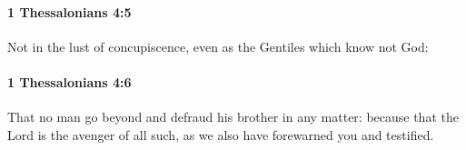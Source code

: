 		\paragraph{1 Thessalonians 4:5} %
			\label{1THESSALONIANS-4-5}

			Not in the lust of concupiscence, even as the Gentiles which know not God:

			\begin{framed}
			\scriptsize
				\begin{compactdesc}
					\item[SBLG] 
				\end{compactdesc}
			\end{framed}

		\paragraph{1 Thessalonians 4:6} %
			\label{1THESSALONIANS-4-6}

			That no man go beyond and defraud his brother in any matter: because that the Lord is the avenger of all such, as we also have forewarned you and testified.

